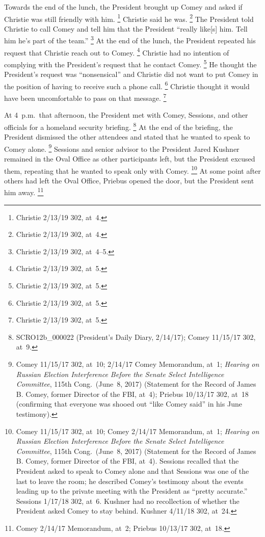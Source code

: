 Towards the end of the lunch, the President brought up Comey and asked if Christie was still friendly with him.%
\footnote{Christie 2/13/19 302, at~4.}
Christie said he was.%
\footnote{Christie 2/13/19 302, at~4.}
The President told Christie to call Comey and tell him that the President ``really like[s] him.
Tell him he's part of the team.''%
\footnote{Christie 2/13/19 302, at~4--5.}
At the end of the lunch, the President repeated his request that Christie reach out to Comey.%
\footnote{Christie 2/13/19 302, at~5.}
Christie had no intention of complying with the President's request that he contact Comey.%
\footnote{Christie 2/13/19 302, at~5.}
He thought the President's request was ``nonsensical'' and Christie did not want to put Comey in the position of having to receive such a phone call.%
\footnote{Christie 2/13/19 302, at~5.}
Christie thought it would have been uncomfortable to pass on that message.%
\footnote{Christie 2/13/19 302, at~5.}

At 4~p.m.\ that afternoon, the President met with Comey, Sessions, and other officials for a homeland security briefing.%
\footnote{SCRO12b\_000022 (President's Daily Diary, 2/14/17);
Comey 11/15/17 302, at~9.}
At the end of the briefing, the President dismissed the other attendees and stated that he wanted to speak to Comey alone.%
\footnote{Comey 11/15/17 302, at~10;
2/14/17 Comey Memorandum, at~1;
\textit{Hearing on Russian Election Interference Before the Senate Select Intelligence Committee}, 115th Cong.\ (June~8, 2017) (Statement for the Record of James B. Comey, former Director of the FBI, at~4);
Priebus 10/13/17 302, at~18 (confirming that everyone was shooed out ``like Comey said'' in his June testimony).}
Sessions and senior advisor to the President Jared Kushner remained in the Oval Office as other participants left, but the President excused them, repeating that he wanted to speak only with Comey.%
\footnote{Comey 11/15/17 302, at~10;
Comey 2/14/17 Memorandum, at~1;
\textit{Hearing on Russian Election Interference Before the Senate Select Intelligence Committee}, 115th Cong.\ (June~8, 2017) (Statement for the Record of James B. Comey, former Director of the FBI, at~4).
Sessions recalled that the President asked to speak to Comey alone and that Sessions was one of the last to leave the room;
he described Comey's testimony about the events leading up to the private meeting with the President as ``pretty accurate.''
Sessions 1/17/18 302, at~6.
Kushner had no recollection of whether the President asked Comey to stay behind.
Kushner 4/11/18 302, at~24.}
At some point after others had left the Oval Office, Priebus opened the door, but the President sent him away.%
\footnote{Comey 2/14/17 Memorandum, at~2;
Priebus 10/13/17 302, at~18.}

